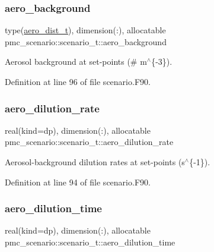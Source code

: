 \subsubsection{\texorpdfstring{aero\+\_\+background}{aero\_background}}
{\footnotesize\ttfamily type(\mbox{\hyperlink{structpmc__aero__dist_1_1aero__dist__t}{aero\+\_\+dist\+\_\+t}}), dimension(\+:), allocatable pmc\+\_\+scenario\+::scenario\+\_\+t\+::aero\+\_\+background}



Aerosol background at set-\/points (\# m$^\wedge$\{-\/3\}). 



Definition at line 96 of file scenario.\+F90.

\mbox{\label{structpmc__scenario_1_1scenario__t_a07fe2dc1bd1215ef637b06741358e744}} 
\subsubsection{\texorpdfstring{aero\+\_\+dilution\+\_\+rate}{aero\_dilution\_rate}}
{\footnotesize\ttfamily real(kind=dp), dimension(\+:), allocatable pmc\+\_\+scenario\+::scenario\+\_\+t\+::aero\+\_\+dilution\+\_\+rate}



Aerosol-\/background dilution rates at set-\/points (s$^\wedge$\{-\/1\}). 



Definition at line 94 of file scenario.\+F90.

\mbox{\label{structpmc__scenario_1_1scenario__t_a89d22a74adbcf2a73838db8dd2c370c3}} 
\subsubsection{\texorpdfstring{aero\+\_\+dilution\+\_\+time}{aero\_dilution\_time}}
{\footnotesize\ttfamily real(kind=dp), dimension(\+:), allocatable pmc\+\_\+scenario\+::scenario\+\_\+t\+::aero\+\_\+dilution\+\_\+time}



